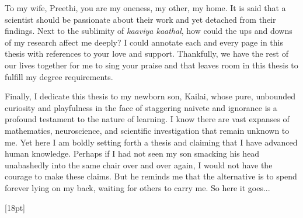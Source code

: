 \documentclass[11pt]{report}
\begin{document}
To my wife, Preethi, you are my oneness, my other, my home. It is said that a scientist should be passionate about their work and yet detached from their findings. Next to the sublimity of \textit{kaaviya kaathal}, how could the ups and downs of my research affect me deeply? I could annotate each and every page in this thesis with references to your love and support. Thankfully, we have the rest of our lives together for me to sing your praise and that leaves room in this thesis to fulfill my degree requirements. 

Finally, I dedicate this thesis to my newborn son, Kailai, whose pure, unbounded curiosity and playfulness in the face of staggering naivete and ignorance is a profound testament to the nature of learning. I know there are vast expanses of mathematics, neuroscience, and scientific investigation that remain unknown to me. Yet here I am boldly setting forth a thesis and claiming that I have advanced human knowledge. Perhaps if I had not seen my son smacking his head unabashedly into the same chair over and over again, I would not have the courage to make these claims. But he reminds me that the alternative is to spend forever lying on my back, waiting for others to carry me. So here it goes...





\renewcommand{\figureautorefname}{Fig.}
\renewcommand{\subsectionautorefname}{Section}
\renewcommand{\sectionautorefname}{Section}
\renewcommand{\chapterautorefname}{Chapter}
\renewcommand{\thefootnote}{\fnsymbol{footnote}}
\hypersetup{linkcolor=seccolor}
\renewcommand{\figurename}{Fig.}

\newpage


\newpage



\newpage

\hypersetup{linkcolor=black}
\renewcommand*\contentsname{\color{seccolor}Table of contents}
[18pt]{\addvspace{3pt}}{\thecontentslabel\enspace}{}{\contentspage}
\tableofcontents

\newpage

\renewcommand{\chaptermark}[1]{\markboth{#1}{#1}}
\fancyfoot[R]{\color{seccolor}\thepage}
\fancyhead[R]{}
\fancyhead[L]{{\color{gray}\textit{\chaptername\ \thechapter}\ --\ \leftmark}}

\setcounter{page}{1}
\end{document}
